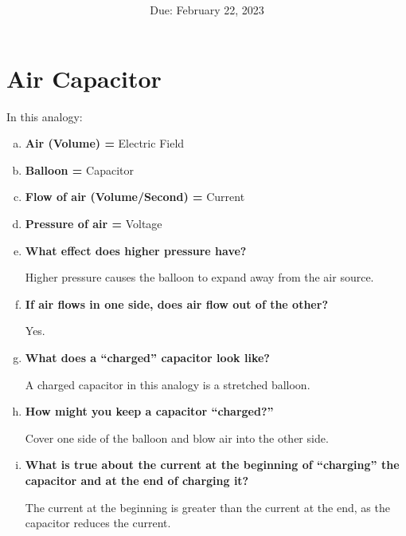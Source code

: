 \documentclass[article, 12pt]{article}
\title{
    \vspace{2in}
    \textmd{\textbf{\labTitle}}
    \normalsize\vspace{0.1in}\\
    \vspace{0.1in}\large{\text{\class: \professor}}
    \vspace{3in}
}
\author{\name}
\date{Due: February 22, 2023}
\begin{document}
    \maketitle
    \thispagestyle{empty}
    \pagebreak
    \section{Air Capacitor}
    In this analogy:
    \begin{enumerate}[a)]
        \item \textbf{Air (Volume) =} Electric Field
        \item \textbf{Balloon =} Capacitor 
        \item \textbf{Flow of air (Volume/Second) =} Current
        \item \textbf{Pressure of air =} Voltage
        \item \textbf{What effect does higher pressure have?}
        
        Higher pressure causes the balloon to expand away from the air source.
        \item\textbf{If air flows in one side, does air flow out of the other?}
        
        Yes.
        \item \textbf{What does a ``charged'' capacitor look like?}
        
        A charged capacitor in this analogy is a stretched balloon.
        \item \textbf{How might you keep a capacitor ``charged?''}
        
        Cover one side of the balloon and blow air into the other side.
        \item \textbf{What is true about the current at the beginning of ``charging'' the capacitor and at the end of charging it?}
        
        The current at the beginning is greater than the current at the end, as the capacitor reduces the current.
    \end{enumerate}
    
\end{document}
